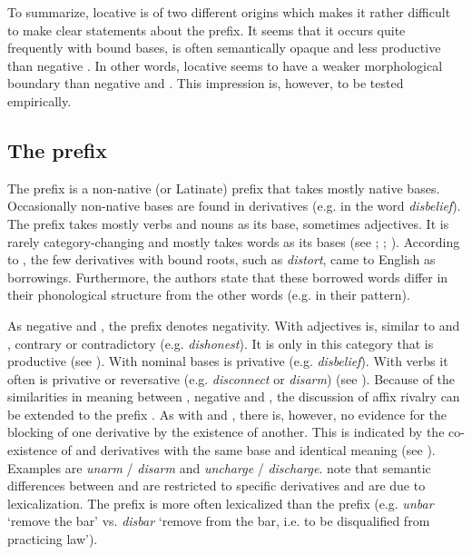 To summarize, locative  is of two different origins which makes it rather difficult to make clear statements about the prefix. It seems that it occurs quite frequently with bound bases, is often semantically opaque and less productive than negative . In other words, locative  seems to have a weaker morphological boundary than negative  and . This impression is, however, to be tested empirically.

 
\subsection{The prefix }

The prefix  is a non-native (or Latinate) prefix that takes mostly native bases. Occasionally non-native bases are found in derivatives (e.g. in the word \textit{disbelief}). The prefix takes mostly verbs and nouns as its base, sometimes adjectives. It is rarely category-changing and mostly takes words as its bases (see \citealt[481]{Jespersen.1965}; \citealt[158ff.]{Marchand.1969}; \citealt[355, 357]{Bauer.2013}).
According to \citet[358]{Bauer.2013}, the few derivatives with bound roots, such as \textit{distort}, came to English as borrowings. Furthermore, the authors state that these borrowed words differ in their phonological structure from the other words (e.g. in their  pattern).


As negative  and , the prefix  denotes negativity.  With adjectives  is, similar to  and , contrary or contradictory (e.g. \textit{dishonest}). It is only in this category that  is productive (see \citealt[358]{Bauer.2013}). With nominal bases  is privative (e.g. \textit{disbelief}). With verbs it often is privative or reversative (e.g. \textit{disconnect} or \textit{disarm})  (see \citealt[372, 375]{Bauer.2013}).
Because of the similarities in meaning between , negative  and , the discussion of affix rivalry can be extended to the prefix . 
As with  and , there is, however, no evidence for the blocking of one derivative by the existence of another. This is indicated by the co-existence of  and derivatives with the same base and identical meaning (see \citealt[380]{Bauer.2013}). Examples are \textit{unarm} / \textit{disarm} and \textit{uncharge} / \textit{discharge}. 
\citet[380]{Bauer.2013} note that semantic differences between  and  are restricted to specific derivatives and are due to lexicalization. The prefix  is more often lexicalized than the prefix  (e.g. \textit{unbar} `remove the bar' vs. \textit{disbar} `remove from the bar, i.e. to be disqualified from practicing law').

